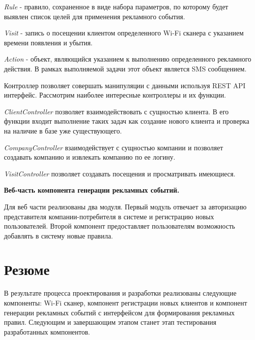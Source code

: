 \textit{Rule} - правило, сохраненное в виде набора параметров, по которому будет выявлен список целей для применения рекламного события. 

\textit{Visit} - запись о посещении клиентом определенного Wi-Fi сканера с указанием времени появления и убытия.

\textit{Action} - объект, являющийся указанием к выполнению определенного рекламного действия. В рамках выполняемой задачи этот объект является SMS сообщением. 

Контроллер позволяет совершать манипуляции с данными используя REST API интерфейс. Рассмотрим наиболее интересные контроллеры и их функции.

 \textit{ClientController} позволяет взаимодействовать с сущностью клиента. В его функции входит выполнение таких задач как создание нового клиента и проверка на наличие в базе уже существующего.

 \textit{CompanyController} взаимодействует с сущностью компании и позволяет создавать компанию и извлекать компанию по ее логину.

 \textit{VisitController} позволяет создавать посещения и просматривать имеющиеся. 

\textbf{Веб-часть компонента генерации рекламных событий.}

Для веб части реализованы два модуля. Первый модуль отвечает за авторизацию представителя компании-потребителя в системе и регистрацию новых пользователей. Второй компонент предоставляет пользователям возможность добавлять в систему новые правила.

\section{Резюме}

В результате процесса проектирования и разработки реализованы следующие компоненты: Wi-Fi сканер, компонент регистрации новых клиентов и компонент генерации рекламных событий с интерфейсом для формирования рекламных правил. Следующим и завершающим этапом станет этап тестирования разработанных компонентов.